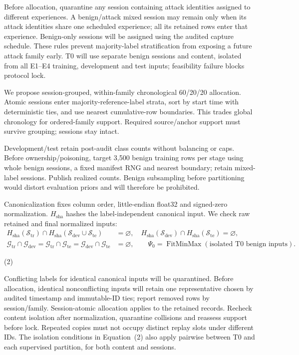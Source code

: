 \documentclass[10pt,a4paper]{article}
\begin{document}
Before allocation, quarantine any session containing attack identities assigned to different experiences. A benign/attack mixed session may remain only when its attack identities share one scheduled experience; all its retained rows enter that experience. Benign-only sessions will be assigned using the audited capture schedule. These rules prevent majority-label stratification from exposing a future attack family early. T0 will use separate benign sessions and content, isolated from all E1--E4 training, development and test inputs; feasibility failure blocks protocol lock.

We propose session-grouped, within-family chronological 60/20/20 allocation. Atomic sessions enter majority-reference-label strata, sort by start time with deterministic ties, and use nearest cumulative-row boundaries. This trades global chronology for ordered-family support. Required source/anchor support must survive grouping; sessions stay intact.

Development/test retain post-audit class counts without balancing or caps. Before ownership/poisoning, target 3,500 benign training rows per stage using whole benign sessions, a fixed manifest RNG and nearest boundary; retain mixed-label sessions. Publish realized counts. Benign subsampling before partitioning would distort evaluation priors and will therefore be prohibited.

Canonicalization fixes column order, little-endian float32 and signed-zero normalization. $H_{\mathrm{sha}}$ hashes the label-independent canonical input. We check raw retained and final normalized inputs:
\begin{equation}
\begin{aligned}
H_{\mathrm{sha}}(\mathcal S_{\mathrm{tr}})\cap H_{\mathrm{sha}}(\mathcal S_{\mathrm{dev}}\cup\mathcal S_{\mathrm{te}})&=\varnothing,\quad
H_{\mathrm{sha}}(\mathcal S_{\mathrm{dev}})\cap H_{\mathrm{sha}}(\mathcal S_{\mathrm{te}})=\varnothing,\\
\mathcal G_{\mathrm{tr}}\cap\mathcal G_{\mathrm{dev}}=\mathcal G_{\mathrm{tr}}\cap\mathcal G_{\mathrm{te}}=\mathcal G_{\mathrm{dev}}\cap\mathcal G_{\mathrm{te}}&=\varnothing,\qquad
\Psi_0=\operatorname{FitMinMax}(\text{isolated T0 benign inputs}).
\end{aligned}

\end{equation}
\par\hfill(2)\par

Conflicting labels for identical canonical inputs will be quarantined. Before allocation, identical nonconflicting inputs will retain one representative chosen by audited timestamp and immutable-ID ties; report removed rows by session/family. Session-atomic allocation applies to the retained records. Recheck content isolation after normalization, quarantine collisions and reassess support before lock. Repeated copies must not occupy distinct replay slots under different IDs. The isolation conditions in Equation~(2) also apply pairwise between T0 and each supervised partition, for both content and sessions.
\end{document}
